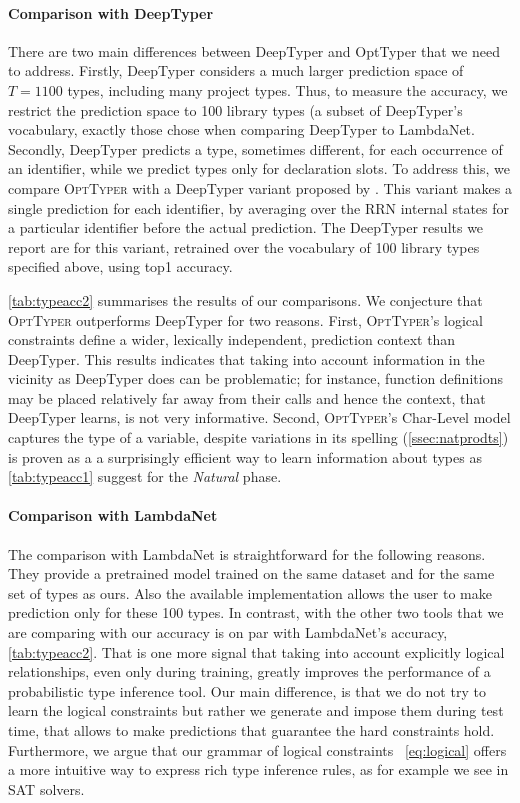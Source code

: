 \documentclass[acmsmall, review, anonymous]{acmart}\settopmatter{printfolios=true,printccs=false,printacmref=false}
\newcommand{\projectname}{\textsc{OptTyper}\xspace}
\begin{document}
\paragraph{Comparison with DeepTyper}
There are two main differences between DeepTyper 
and OptTyper that we need to address. Firstly, DeepTyper considers a much larger prediction space of $T=1100$ types, including many project types. Thus, to measure the accuracy, we restrict the prediction space to 100 library types (a subset of DeepTyper's vocabulary, exactly those \citet{wei20} chose when comparing DeepTyper to LambdaNet.
Secondly, DeepTyper predicts a type, sometimes different, for each occurrence of an identifier, while we predict types only for declaration slots. To address this, we compare \projectname{} with a DeepTyper variant proposed by \cite{wei20}.
This variant makes a single prediction for each identifier, by averaging over the RRN internal states for a particular identifier before the actual prediction.
The DeepTyper results we report are for this variant, retrained over the vocabulary of 100 library types specified above, using top1 accuracy.

\cref{tab:typeacc2} summarises the results of our comparisons. We conjecture that \projectname outperforms DeepTyper for two reasons. First, \projectname's logical constraints define
a wider, lexically independent, prediction context than DeepTyper. This results indicates that taking into account information in the vicinity as DeepTyper does can be problematic; for instance,
function definitions may be placed relatively far away from their calls and hence the context, that DeepTyper learns, is not very informative. Second, \projectname's Char-Level model captures the type of a variable, despite variations 
in its spelling (\cref{ssec:natprodts}) is proven as a a surprisingly efficient way to learn information about types as \cref{tab:typeacc1} suggest for the \textit{Natural} phase.   


\paragraph{Comparison with LambdaNet}
The comparison with LambdaNet is straightforward
for the following reasons. They provide a pretrained model trained on the same dataset and for the same set of types as ours. Also the available implementation  allows the user to make prediction only for these 100 types. In contrast, with
the other two tools that we are comparing with 
our accuracy is on par with LambdaNet's accuracy,\cref{tab:typeacc2}.
That is one more signal that taking into account explicitly logical relationships, even only during training,
greatly improves the performance of a probabilistic
type inference tool. Our main difference, is that
we do not try to learn the logical constraints but rather we generate and impose them during test time, that allows to make predictions that guarantee the
hard constraints hold. Furthermore, we argue that our grammar of logical constraints ~\eqref{eq:logical}
offers a more intuitive way to express rich type inference rules, as for example we see in SAT solvers.
\end{document}
